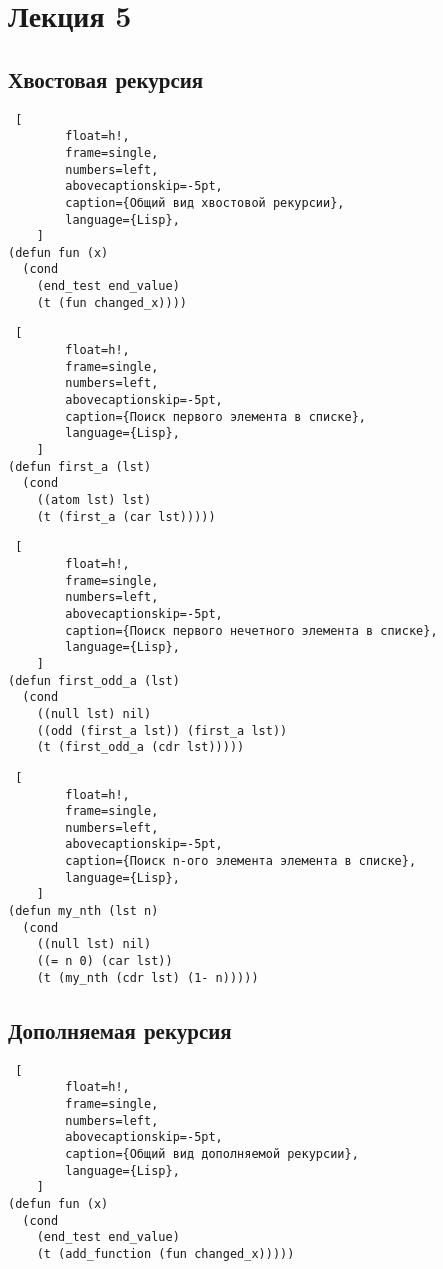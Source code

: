 \chapter{Лекция 5}

\section{Хвостовая рекурсия}

\begin{lstlisting} [
		float=h!,
		frame=single,
		numbers=left,
		abovecaptionskip=-5pt,
		caption={Общий вид хвостовой рекурсии},
		language={Lisp},
	]
(defun fun (x)
  (cond
    (end_test end_value)
    (t (fun changed_x))))
\end{lstlisting}

\begin{lstlisting} [
		float=h!,
		frame=single,
		numbers=left,
		abovecaptionskip=-5pt,
		caption={Поиск первого элемента в списке},
		language={Lisp},
	]
(defun first_a (lst)
  (cond
    ((atom lst) lst)
    (t (first_a (car lst)))))
\end{lstlisting}

\begin{lstlisting} [
		float=h!,
		frame=single,
		numbers=left,
		abovecaptionskip=-5pt,
		caption={Поиск первого нечетного элемента в списке},
		language={Lisp},
	]
(defun first_odd_a (lst)
  (cond
    ((null lst) nil)
    ((odd (first_a lst)) (first_a lst))
    (t (first_odd_a (cdr lst)))))
\end{lstlisting}

\begin{lstlisting} [
		float=h!,
		frame=single,
		numbers=left,
		abovecaptionskip=-5pt,
		caption={Поиск n-ого элемента элемента в списке},
		language={Lisp},
	]
(defun my_nth (lst n)
  (cond
    ((null lst) nil)
    ((= n 0) (car lst))
    (t (my_nth (cdr lst) (1- n)))))
\end{lstlisting}

\section{Дополняемая рекурсия}

\begin{lstlisting} [
		float=h!,
		frame=single,
		numbers=left,
		abovecaptionskip=-5pt,
		caption={Общий вид дополняемой рекурсии},
		language={Lisp},
	]
(defun fun (x)
  (cond
    (end_test end_value)
    (t (add_function (fun changed_x)))))
\end{lstlisting}

